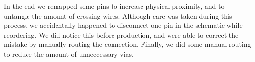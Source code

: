In the end we remapped some pins to increase physical proximity, and to untangle
the amount of crossing wires. Although care was taken during this process, we
accidentally happened to disconnect one pin in the schematic while reordering.
We did notice this before production, and were able to correct the mistake by
manually routing the connection. Finally, we did some manual routing to reduce
the amount of unneccessary vias.

